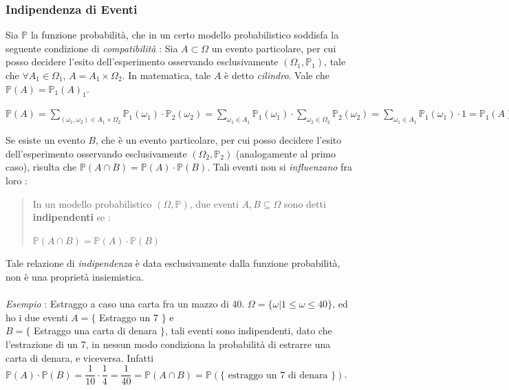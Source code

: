 \documentclass[12pt, letterpaper]{article}
\begin{document}
\subsubsection{Indipendenza di Eventi}
Sia \(\mathbb{P}\) la funzione probabilità, che in un certo modello probabilistico soddisfa la seguente 
condizione di \textit{compatibilità} : Sia \(A\subset\Omega\) un evento particolare, per cui posso decidere 
l'esito dell'esperimento osservando esclusivamente \((\Omega_1,\mathbb{P}_1)\), tale che \(\forall A_1 \in \Omega_1\), \(A=A_1\times \Omega_2\).
In matematica, tale \(A\) è detto \textit{cilindro}. Vale che \(\mathbb{P}(A)=\mathbb{P}_1(A)_1\).\begin{center}
\(
  \mathbb{P}(A)=\displaystyle\sum_{(\omega_1,\omega_2)\in A_1\times\Omega_2}\mathbb{P}_1(\omega_1)\cdot\mathbb{P}_2(\omega_2)  
    =\displaystyle\sum_{\omega_1\in A_1}\mathbb{P}_1(\omega_1)\cdot\displaystyle\sum_{\omega_2\in \Omega_2}\mathbb{P}_2(\omega_2)=\displaystyle\sum_{\omega_1\in A_1}\mathbb{P}_1(\omega_1)\cdot 1=\mathbb{P}_1(A)_1
  \)
\end{center}
Se esiste un evento \(B\), che è un evento particolare, per cui posso decidere 
l'esito dell'esperimento osservando esclusivamente \((\Omega_2,\mathbb{P}_2)\) (analogamente al primo caso), 
risulta che \(\mathbb{P}(A\cap B)=\mathbb{P}(A)\cdot\mathbb{P}(B)\). Tali eventi non si \textit{influenzano} 
fra loro : \begin{quote}
    In un modello probabilistico \((\Omega,\mathbb{P})\), due eventi \(A,B\subseteq \Omega\) sono detti 
    \textbf{indipendenti} se : \begin{center}
        \(\mathbb{P}(A\cap B)=\mathbb{P}(A)\cdot\mathbb{P}(B)\)
    \end{center}
\end{quote}
Tale relazione di \textit{indipendenza} è data esclusivamente dalla funzione probabilità, non è 
una proprietà insiemistica.\\\hphantom{.}\\\textit{Esempio }:
Estraggo a caso una carta fra un mazzo di 40. \(\Omega=\{\omega|1\le\omega\le40\} \), 
ed ho i due eventi \(A=\{\) Estraggo un 7 \(\}\) e \\\(B=\{\) Estraggo una carta di denara \(\}\), tali 
eventi sono indipendenti, dato che l'estrazione di un 7, in nessun modo condiziona la probabilità di 
estrarre una carta di denara, e viceversa. Infatti \(\mathbb{P}(A)\cdot\mathbb{P}(B)=\dfrac{1}{10}\cdot\dfrac{1}{4}=\dfrac{1}{40}=\mathbb{P}(A\cap B)=
\mathbb{P}(\{\text{ estraggo un 7 di denara }\})\).
\end{document}
